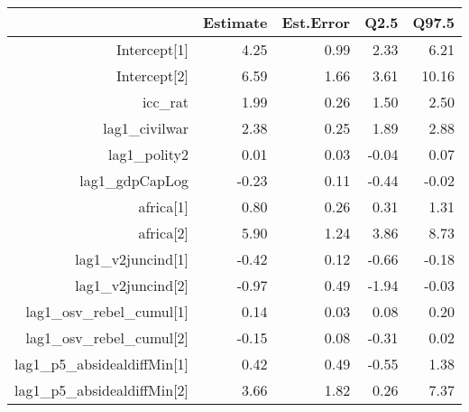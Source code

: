 \begin{table}[ht]
\centering
\begin{tabular}{rrrrr}
  \hline
 & Estimate & Est.Error & Q2.5 & Q97.5 \\ 
  \hline
Intercept[1] & 4.25 & 0.99 & 2.33 & 6.21 \\ 
  Intercept[2] & 6.59 & 1.66 & 3.61 & 10.16 \\ 
  icc\_rat & 1.99 & 0.26 & 1.50 & 2.50 \\ 
  lag1\_civilwar & 2.38 & 0.25 & 1.89 & 2.88 \\ 
  lag1\_polity2 & 0.01 & 0.03 & -0.04 & 0.07 \\ 
  lag1\_gdpCapLog & -0.23 & 0.11 & -0.44 & -0.02 \\ 
  africa[1] & 0.80 & 0.26 & 0.31 & 1.31 \\ 
  africa[2] & 5.90 & 1.24 & 3.86 & 8.73 \\ 
  lag1\_v2juncind[1] & -0.42 & 0.12 & -0.66 & -0.18 \\ 
  lag1\_v2juncind[2] & -0.97 & 0.49 & -1.94 & -0.03 \\ 
  lag1\_osv\_rebel\_cumul[1] & 0.14 & 0.03 & 0.08 & 0.20 \\ 
  lag1\_osv\_rebel\_cumul[2] & -0.15 & 0.08 & -0.31 & 0.02 \\ 
  lag1\_p5\_absidealdiffMin[1] & 0.42 & 0.49 & -0.55 & 1.38 \\ 
  lag1\_p5\_absidealdiffMin[2] & 3.66 & 1.82 & 0.26 & 7.37 \\ 
   \hline
\end{tabular}
\end{table}
